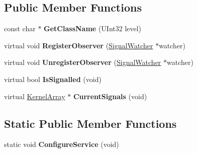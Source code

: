 \subsection*{Public Member Functions}
\begin{DoxyCompactItemize}
\item 
\mbox{\label{class_blockable_object_a7fcae647f5c77522758c7b380556270a}} 
const char $\ast$ {\bfseries Get\+Class\+Name} (U\+Int32 level)
\item 
\mbox{\label{class_blockable_object_acc62e90014951c5bb0dc78e4d7007d74}} 
virtual void {\bfseries Register\+Observer} (\hyperlink{class_signal_watcher}{Signal\+Watcher} $\ast$watcher)
\item 
\mbox{\label{class_blockable_object_a2e9cf7519914139866e17bbf10a74dfd}} 
virtual void {\bfseries Unregister\+Observer} (\hyperlink{class_signal_watcher}{Signal\+Watcher} $\ast$watcher)
\item 
\mbox{\label{class_blockable_object_ae7010f91737c37796fcc5ad99f129265}} 
virtual bool {\bfseries Is\+Signalled} (void)
\item 
\mbox{\label{class_blockable_object_afcfe6d01f5ecec42b390cb4d6a98d1ef}} 
virtual \hyperlink{class_kernel_array}{Kernel\+Array} $\ast$ {\bfseries Current\+Signals} (void)
\end{DoxyCompactItemize}
\subsection*{Static Public Member Functions}
\begin{DoxyCompactItemize}
\item 
\mbox{\label{class_blockable_object_ad3abd46cd8e31a8691a1c564fcda83fc}} 
static void {\bfseries Configure\+Service} (void)
\end{DoxyCompactItemize}
